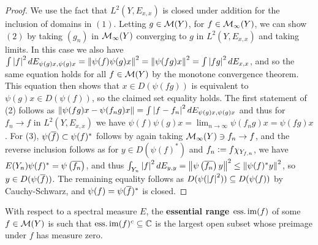 \documentclass[10pt]{amsart}
\begin{document}
\begin{proof}
    We use the fact that $L^2(Y, E_{x, x})$ is closed under addition for the inclusion of domains in $(1)$. Letting $g \in \mathcal{M}(Y)$, for $f \in \mathcal{M}_\infty(Y)$, we can show $(2)$ by taking $(g_n)$ in $\mathcal{M}_\infty(Y)$ converging to $g$ in $L^2(Y, E_{x, x})$ and taking limits. In this case we also have $\int\left| f \right|^2 dE_{\psi(g)x, \psi(g)x} = \left\| \psi(f)\psi(g)x \right\|^2 = \left\| \psi(fg)x \right\|^2 = \int\left| fg \right|^2 dE_{x, x}$, and so the same equation holds for all $f \in \mathcal{M}(Y)$ by the monotone convergence theorem. This equation then shows that $x \in D(\psi(fg))$ is equivalent to $\psi(g)x \in D(\psi(f))$, so the claimed set equality holds. The first statement of (2) follows as $\left\| \psi(fg)x - \psi(f_ng)x \right\| = \int\left| f - f_n \right|^2dE_{\psi(g)x, \psi(g)x}$ and thus for $f_n \to f$ in $L^2(Y, E_{x, x})$ we have $\psi(f)\psi(g)x = \lim_{n \to \infty}\psi(f_n g)x = \psi(fg)x$. For (3), $\psi(\overline{f}) \subset \psi(f)^*$ follows by again taking $\mathcal{M}_\infty(Y) \ni f_n \to f$, and the reverse inclusion follows as for $y \in D(\psi(f)^*)$ and $f_n \vcentcolon= f\chi_{Y_{f, n}}$, we have $E(Y_n)\psi(f)^* = \psi\left(  \overline{f_n}  \right)$, and thus $\int_{Y_n}\left| f \right|^2 dE_{y, y} = \left\| \psi\left(  \overline{f_n}  \right)y \right\|^2 \leq \left\| \psi(f)^*y \right\|^2$, so $y \in D(\psi(\overline{f}))$. The remaining equality follows as $D(\psi(\left| f \right|^2)) \subseteq D(\psi(f))$ by Cauchy-Schwarz, and $\psi(f) = \psi(\overline{f})^*$ is closed.
\end{proof}
With respect to a spectral measure $E$, the \textbf{essential range $\operatorname{ess.im}(f)$} of some $f \in \mathcal{M}(Y)$ is such that $\operatorname{ess.im}(f)^c \subseteq \mathbb{C}$ is the largest open subset whose preimage under $f$ has measure zero.
\end{document}
